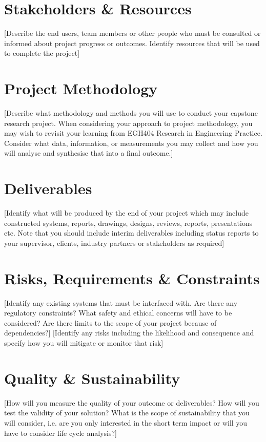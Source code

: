 \documentclass[11pt]{article}
\begin{document}
\section{Stakeholders \& Resources}
[Describe the end users, team members or other people who must be consulted or informed about
project progress or outcomes. Identify resources that will be used to complete the project]




\section{Project Methodology}
[Describe what methodology and methods you will use to conduct your capstone research project.
When considering your approach to project methodology, you may wish to revisit your learning from
EGH404 Research in Engineering Practice. Consider what data, information, or measurements you
may collect and how you will analyse and synthesise that into a final outcome.]

\section{Deliverables}
[Identify what will be produced by the end of your project which may include constructed systems,
reports, drawings, designs, reviews, reports, presentations etc. Note that you should include interim
deliverables including status reports to your supervisor, clients, industry partners or stakeholders as
required]

\section{Risks, Requirements \& Constraints}
[Identify any existing systems that must be interfaced with. Are there any regulatory constraints?
What safety and ethical concerns will have to be considered? Are there limits to the scope of your
project because of dependencies?]
[Identify any risks including the likelihood and consequence and specify how you will mitigate or
monitor that risk]

\section{Quality \& Sustainability}
[How will you measure the quality of your outcome or deliverables? How will you test the validity of
your solution? What is the scope of sustainability that you will consider, i.e. are you only interested in
the short term impact or will you have to consider life cycle analysis?]
\end{document}
